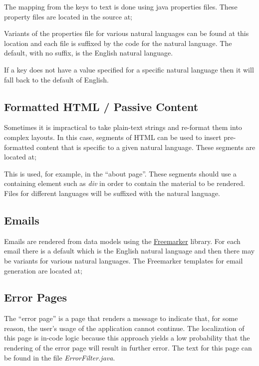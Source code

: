 The mapping from the keys to text is done using java properties files.  These property files are located in the source at;


Variants of the properties file for various natural languages can be found at this location and each file is suffixed by the code for the natural language.  The default, with no suffix, is the English natural language.

If a key does not have a value specified for a specific natural language then it will fall back to the default of English.

\subsection{Formatted HTML / Passive Content}

Sometimes it is impractical to take plain-text strings and re-format them into complex layouts.  In this case, segments of HTML can be used to insert pre-formatted content that is specific to a given natural language.  These segments are located at;


This is used, for example, in the ``about page''.  These segments should use a containing element such as {\it div} in order to contain the material to be rendered.  Files for different languages will be suffixed with the natural language.

\subsection{Emails}

Emails are rendered from data models using the \href{http://freemarker.org/}{Freemarker} library.  For each email there is a default which is the English natural language and then there may be variants for various natural languages.  The Freemarker templates for email generation are located at;


\subsection{Error Pages}

The ``error page'' is a page that renders a message to indicate that, for some reason, the user's usage of the application cannot continue.  The localization of this page is in-code logic because this approach yields a low probability that the rendering of the error page will result in further error.  The text for this page can be found in the file {\it ErrorFilter.java}.

